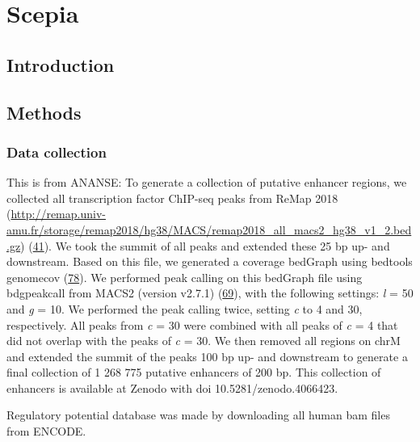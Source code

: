 \chapter{Scepia}\thumbforchapter
{}
\newpage

\section{Introduction}

\section{Methods}

\subsection{Data collection}

This is from ANANSE:
To generate a collection of putative enhancer regions, we collected all transcription factor ChIP-seq peaks from ReMap 2018 (\href{http://remap.univ-amu.fr/storage/remap2018/hg38/MACS/remap2018_all_macs2_hg38_v1_2.bed.gz}{http://remap.univ-amu.fr/storage/remap2018/hg38/MACS/remap2018\_all\_macs2\_hg38\_v1\_2.bed.gz}) (\href{javascript:;}{41}). We took the summit of all peaks and extended these 25 bp up- and downstream. Based on this file, we generated a coverage bedGraph using bedtools genomecov (\href{javascript:;}{78}). We performed peak calling on this bedGraph file using bdgpeakcall from MACS2 (version v2.7.1) (\href{javascript:;}{69}), with the following settings: \textit{l} = 50 and \textit{g} = 10. We performed the peak calling twice, setting \textit{c} to 4 and 30, respectively. All peaks from \textit{c} = 30 were combined with all peaks of \textit{c} = 4 that did not overlap with the peaks of \textit{c} = 30. We then removed all regions on chrM and extended the summit of the peaks 100 bp up- and downstream to generate a final collection of 1 268 775 putative enhancers of 200 bp. This collection of enhancers is available at Zenodo with doi 10.5281/zenodo.4066423.

Regulatory potential database was made by downloading all human bam files from ENCODE.

